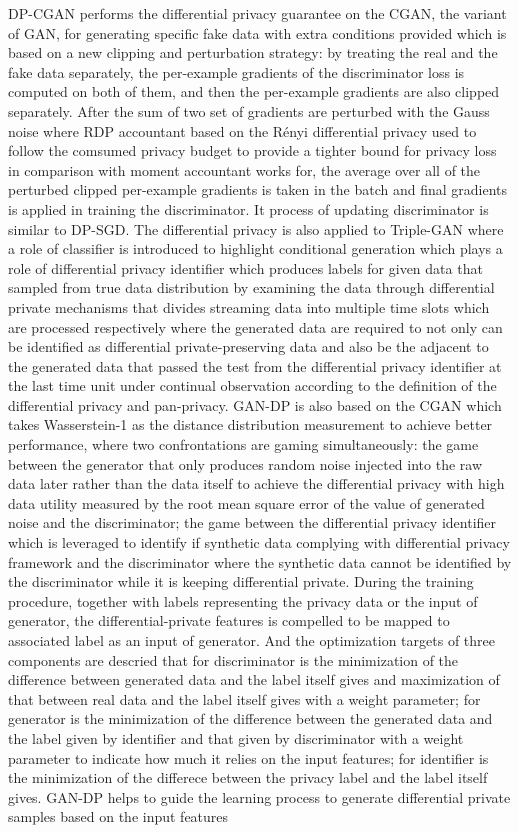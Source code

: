 \documentclass[conference]{IEEEtran}
\begin{document}
DP-CGAN\cite{b38} performs the differential privacy guarantee on the CGAN, the variant of GAN, for generating specific fake data with extra conditions provided which is based on a new clipping and perturbation strategy: by treating the real and the fake data separately, the per-example gradients of the discriminator loss is computed on both of them, and then the per-example gradients are also clipped separately. After the sum of two set of gradients are perturbed with the Gauss noise where RDP accountant based on the Rényi differential privacy used to follow the comsumed privacy budget to provide a tighter bound for privacy loss in comparison with moment accountant works for, the average over all of the perturbed clipped per-example gradients is taken in the batch and final gradients is applied in training the discriminator. It process of updating discriminator is similar to DP-SGD. The differential privacy is also applied to Triple-GAN where a role of classifier is introduced to highlight conditional generation which plays a role of differential privacy identifier\cite{b39} which produces labels for given data that sampled from true data distribution by examining the data through differential private mechanisms that divides streaming data into multiple time slots which are processed respectively where the generated data are required to not only can be identified as differential private-preserving data and also be the adjacent to the generated data that passed the test from the differential privacy identifier at the last time unit under continual observation according to the definition of the differential privacy and pan-privacy. GAN-DP\cite{b40} is also based on the CGAN which takes Wasserstein-1 as the distance distribution measurement to achieve better performance, where two confrontations are gaming simultaneously: the game between the generator that only produces random noise injected into the raw data later rather than the data itself to achieve the differential privacy with high data utility measured by the root mean square error of the value of generated noise and the discriminator; the game between the differential privacy identifier which is leveraged to identify if synthetic data complying with differential privacy framework and the discriminator where the synthetic data cannot be identified by the discriminator while it is keeping differential private. During the training procedure, together with labels representing the privacy data or the input of generator, the differential-private features is compelled to be mapped to associated label as an input of generator. And the optimization targets of three components are descried that for discriminator is the minimization of the difference between generated data and the label itself gives and maximization of that between real data and the label itself gives with a weight parameter; for generator is the minimization of the difference between the generated data and the label given by identifier and that given by discriminator with a weight parameter to indicate how much it relies on the input features;  for identifier is the minimization of the differece between the privacy label and the label itself gives. GAN-DP helps to guide the learning process to generate differential private samples based on the input features 
\end{document}
